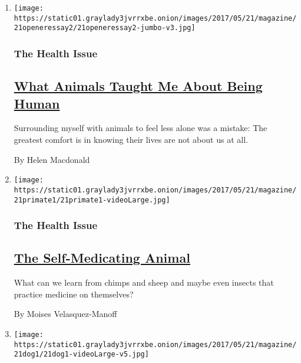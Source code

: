 \begin{enumerate}
\def\labelenumi{\arabic{enumi}.}
\item
  \texttt{[image: https://static01.graylady3jvrrxbe.onion/images/2017/05/21/magazine/21openeressay2/21openeressay2-jumbo-v3.jpg]}

  \hypertarget{the-health-issue}{%
  \subsubsection{The Health Issue}\label{the-health-issue}}

  \hypertarget{what-animals-taught-me-about-being-human}{%
  \subsection{\texorpdfstring{\href{/2017/05/16/magazine/what-animals-taught-me-about-being-human.html}{What
  Animals Taught Me About Being
  Human}}{What Animals Taught Me About Being Human}}\label{what-animals-taught-me-about-being-human}}

  Surrounding myself with animals to feel less alone was a mistake: The
  greatest comfort is in knowing their lives are not about us at all.

  By Helen Macdonald
\item
  \texttt{[image: https://static01.graylady3jvrrxbe.onion/images/2017/05/21/magazine/21primate1/21primate1-videoLarge.jpg]}

  \hypertarget{the-health-issue-1}{%
  \subsubsection{The Health Issue}\label{the-health-issue-1}}

  \hypertarget{the-self-medicating-animal}{%
  \subsection{\texorpdfstring{\href{/2017/05/18/magazine/the-self-medicating-animal.html}{The
  Self-Medicating
  Animal}}{The Self-Medicating Animal}}\label{the-self-medicating-animal}}

  What can we learn from chimps and sheep and maybe even insects that
  practice medicine on themselves?

  By Moises Velasquez-Manoff
\item
  \texttt{[image: https://static01.graylady3jvrrxbe.onion/images/2017/05/21/magazine/21dog1/21dog1-videoLarge-v5.jpg]}


\end{enumerate}
